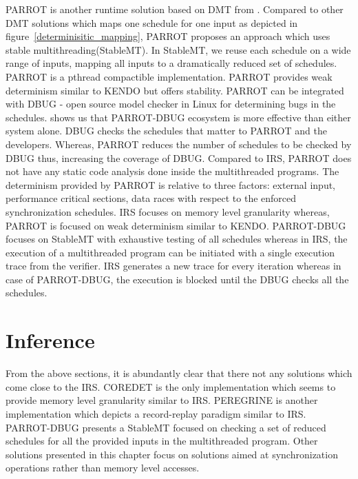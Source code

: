 PARROT is another runtime solution based on DMT from \citet{parrot}. 
Compared to other DMT solutions which maps one schedule for one input as depicted in figure~\ref{determinisitic_mapping}, PARROT proposes an approach which uses stable multithreading(StableMT). 
In StableMT, we reuse each schedule on a wide range of inputs, mapping all inputs to a dramatically reduced set of schedules. 
PARROT is a pthread compactible implementation. 
PARROT provides weak determinism similar to KENDO but offers stability. 
PARROT can be integrated with DBUG\citep{dbug} - open source model checker in Linux for determining bugs in the schedules. 
\citet{parrot} shows us that PARROT-DBUG ecosystem is more effective than either system alone. 
DBUG checks the schedules that matter to PARROT and the developers. 
Whereas, PARROT reduces the number of schedules to be checked by DBUG thus, increasing the coverage of DBUG. 
Compared to IRS, PARROT does not have any static code analysis done inside the multithreaded programs. 
The determinism provided by PARROT is relative to three factors: external input, performance critical sections, data races with respect to the enforced synchronization schedules. 
IRS focuses on memory level granularity whereas, PARROT is focused on weak determinism similar to KENDO. 
PARROT-DBUG focuses on StableMT with exhaustive testing of all schedules whereas in IRS, the execution of a multithreaded program can be initiated with a single execution trace from the verifier. 
IRS generates a new trace for every iteration whereas in case of PARROT-DBUG, the execution is blocked until the DBUG checks all the schedules.

\section*{Inference}

From the above sections, it is abundantly clear that there not any solutions which come close to the IRS. 
COREDET is the only implementation which seems to provide memory level granularity similar to IRS. 
PEREGRINE is another implementation which depicts a record-replay paradigm similar to IRS. 
PARROT-DBUG presents a StableMT focused on checking a set of reduced schedules for all the provided inputs in the multithreaded program. 
Other solutions presented in this chapter focus on solutions aimed at synchronization operations rather than memory level accesses.

